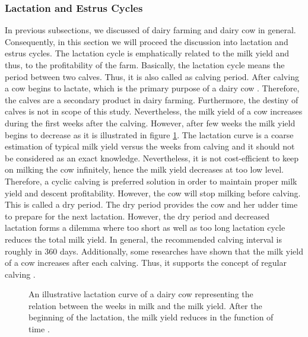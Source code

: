 \documentclass[english,12pt,a4paper,pdftex,elec,utf8]{aaltothesis}
\begin{document}
\subsubsection{Lactation and Estrus Cycles} \label{lactationandestruscyclessection}

In previous subsections, we discussed of dairy farming and dairy cow in general. Consequently, in this section we will proceed the discussion into lactation and estrus cycles. The lactation cycle is emphatically related to the milk yield and thus, to the profitability of the farm. Basically, the lactation cycle means the period between two calves. Thus, it is also called as calving period. After calving a cow begins to lactate, which is the primary purpose of a dairy cow \cite{lehmahavaintoja}. Therefore, the calves are a secondary product in dairy farming. Furthermore, the destiny of calves is not in scope of this study. Nevertheless, the milk yield of a cow increases during the first weeks after the calving. However, after few weeks the milk yield begins to decrease as it is illustrated in figure \ref{lactationapproximation}. The lactation curve is a coarse estimation of typical milk yield versus the weeks from calving and it should not be considered as an exact knowledge. Nevertheless, it is not cost-efficient to keep on milking the cow infinitely, hence the milk yield decreases at too low level. Therefore, a cyclic calving is preferred solution in order to maintain proper milk yield and descent profitability. However, the cow will stop milking before calving. This is called a dry period. The dry period provides the cow and her udder time to prepare for the next lactation. However, the dry  period and decreased lactation forms a dilemma where too short as well as too long lactation cycle reduces the total milk yield. In general, the recommended calving interval is roughly in 360 days. Additionally, some researches have shown that the milk yield of a cow increases after each calving. Thus, it supports the concept of regular calving \cite{lehmientuotoskasvaa}.

 \begin{figure}
 \centering
    \caption{An illustrative lactation curve of a dairy cow representing the relation between the weeks in milk and the milk yield. After the beginning of the lactation, the milk yield reduces in the function of time \cite{lactationcurve}.} \label{lactationapproximation}
 \end{figure}
\end{document}

